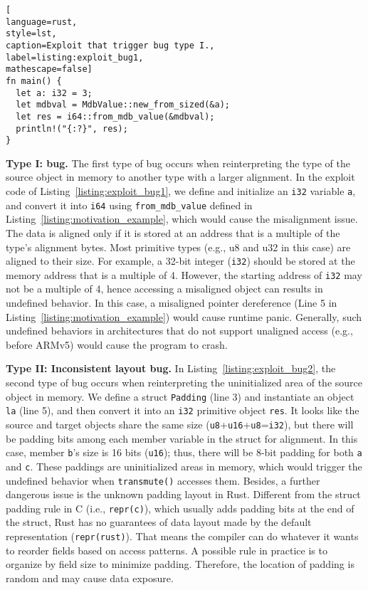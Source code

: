 \begin{appendix}
\begin{lstlisting}[
language=rust, 
style=lst,
caption=Exploit that trigger bug type I.,
label=listing:exploit_bug1,
mathescape=false]
fn main() {
  let a: i32 = 3;
  let mdbval = MdbValue::new_from_sized(&a);
  let res = i64::from_mdb_value(&mdbval);
  println!("{:?}", res);
}
\end{lstlisting}


\vspace{0.05in}
\noindent\textbf{Type I: \Bone bug.} 
The first type of bug occurs when reinterpreting the type of the source object in memory to another type with a larger alignment.
In the exploit code of Listing~\ref{listing:exploit_bug1}, we define and initialize an \texttt{i32} variable \texttt{a}, and convert it into \texttt{i64} using \texttt{from\_mdb\_value} defined in Listing~\ref{listing:motivation_example}, which would cause the misalignment issue.
The data is aligned only if it is stored at an address that is a multiple of the type's alignment bytes. Most primitive types (e.g., u8 and u32 in this case) are aligned to their size. For example, a 32-bit integer (\texttt{i32}) should be stored at the memory address that is a multiple of 4. However, the starting address of \texttt{i32} may not be a multiple of 4, hence accessing a misaligned object can results in undefined behavior. In this case, a misaligned pointer dereference (Line 5 in Listing~\ref{listing:motivation_example}) would cause runtime panic.
Generally, such undefined behaviors in architectures that do not support unaligned access (e.g., before ARMv5) would cause the program to crash.


\vspace{0.05in}
\noindent\textbf{Type II: Inconsistent layout bug.}
In Listing~\ref{listing:exploit_bug2}, the second type of bug occurs when reinterpreting the uninitialized area of the source object in memory. We define a struct \texttt{Padding} (line 3) and instantiate an object \texttt{la} (line 5), and then convert it into an \texttt{i32} primitive object \texttt{res}. It looks like the source and target objects share the same size (\texttt{u8}+\texttt{u16}+\texttt{u8}=\texttt{i32}), but there will be padding bits among each member variable in the struct for alignment. In this case, member \texttt{b}'s size is 16 bits (\texttt{u16}); thus, there will be 8-bit padding for both \texttt{a} and \texttt{c}. These paddings are uninitialized areas in memory, which would trigger the undefined behavior when \texttt{transmute()} accesses them. 
Besides, a further dangerous issue is the unknown padding layout in Rust. Different from the struct padding rule in C (i.e., \texttt{repr(c)}), which usually adds padding bits at the end of the struct, Rust has no guarantees of data layout made by the default representation (\texttt{repr(rust)}). That means the compiler can do whatever it wants to reorder fields based on access patterns. A possible rule in practice is to organize by field size to minimize padding. Therefore, the location of padding is random and may cause data exposure.





\end{appendix}
